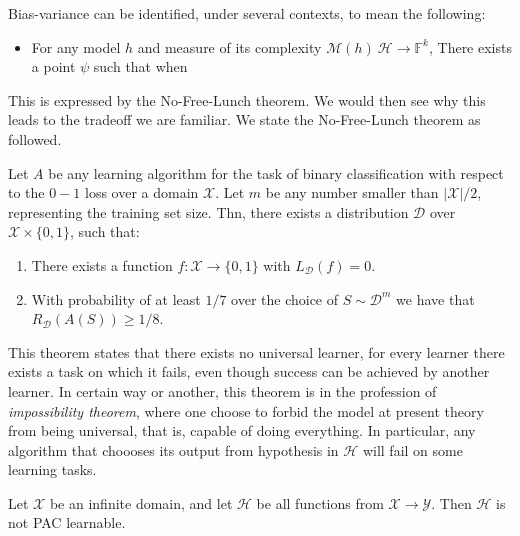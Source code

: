 \begin{conjecture}
    Bias-variance can be identified, under several contexts, to mean the following: \begin{itemize}
        \item For any model $h$ and measure of its complexity $\mathcal{M}(h)\:\mathcal{H}\to \mathbb{F}^{k}$, There exists a point $\psi$ such that when
    \end{itemize}
\end{conjecture}

This is expressed by the No-Free-Lunch theorem. We would then see why this leads to the tradeoff we are familiar. We state the No-Free-Lunch theorem as followed.

\begin{theorem}
    Let $A$ be any learning algorithm for the task of binary classification with respect to the $0-1$ loss over a domain $\mathcal{X}$. Let $m$ be any number smaller than $|\mathcal{X}|/2$, representing the training set size. Thn, there exists a distribution $\mathcal{D}$ over $\mathcal{X}\times \{0,1\}$, such that: 
    \begin{enumerate}
        \item There exists a function $f:\mathcal{X}\to \{0,1\}$ with $L_{\mathcal{D}}(f)= 0$. 
        \item With probability of at least $1/7$ over the choice of $S\sim \mathcal{D}^{m}$ we have that $R_{\mathcal{D}}(A(S))\geq 1/8$. 
    \end{enumerate}
\end{theorem}

This theorem states that there exists no universal learner, for every learner there exists a task on which it fails, even though success can be achieved by another learner. In certain way or another, this theorem is in the profession of \textit{impossibility theorem}, where one choose to forbid the model at present theory from being universal, that is, capable of doing everything. In particular, any algorithm that choooses its output from hypothesis in $\mathcal{H}$ will fail on some learning tasks. 

\begin{col}
    Let $\mathcal{X}$ be an infinite domain, and let $\mathcal{H}$ be all functions from $\mathcal{X}\to \mathcal{Y}$. Then $\mathcal{H}$ is not PAC learnable. 
\end{col}

